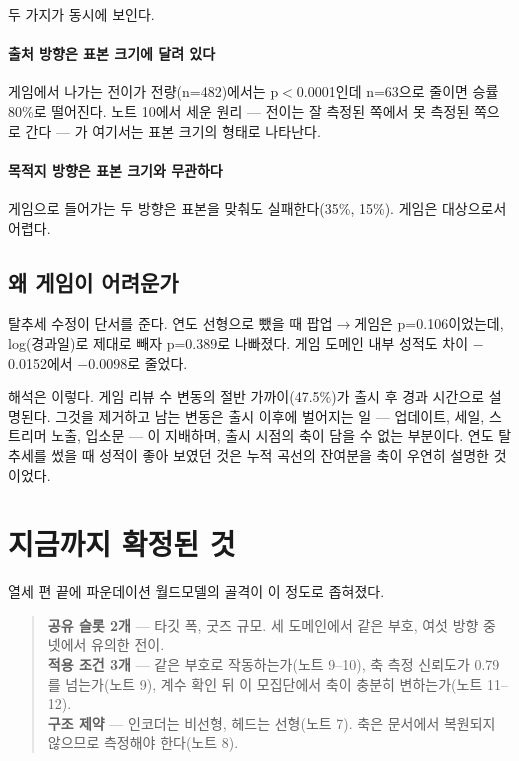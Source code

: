\documentclass[10pt]{article}
\begin{document}
두 가지가 동시에 보인다.

\paragraph{출처 방향은 표본 크기에 달려 있다}
게임에서 나가는 전이가 전량(n=482)에서는 p$<$0.0001인데 n=63으로 줄이면 승률
80\%로 떨어진다. 노트 10에서 세운 원리 --- 전이는 잘 측정된 쪽에서 못 측정된
쪽으로 간다 --- 가 여기서는 표본 크기의 형태로 나타난다.

\paragraph{목적지 방향은 표본 크기와 무관하다}
게임으로 들어가는 두 방향은 표본을 맞춰도 실패한다(35\%, 15\%). 게임은 대상으로서
어렵다.

\subsection{왜 게임이 어려운가}

탈추세 수정이 단서를 준다. 연도 선형으로 뺐을 때 팝업$\to$게임은 p=0.106이었는데,
log(경과일)로 제대로 빼자 p=0.389로 나빠졌다. 게임 도메인 내부 성적도
차이 $-$0.0152에서 $-$0.0098로 줄었다.

해석은 이렇다. 게임 리뷰 수 변동의 절반 가까이(47.5\%)가 출시 후 경과 시간으로
설명된다. 그것을 제거하고 남는 변동은 출시 이후에 벌어지는 일 --- 업데이트, 세일,
스트리머 노출, 입소문 --- 이 지배하며, 출시 시점의 축이 담을 수 없는 부분이다.
연도 탈추세를 썼을 때 성적이 좋아 보였던 것은 누적 곡선의 잔여분을 축이 우연히
설명한 것이었다.


\section{지금까지 확정된 것}

열세 편 끝에 파운데이션 월드모델의 골격이 이 정도로 좁혀졌다.

\begin{quote}\fontsize{9.5}{11.5}\selectfont
\textbf{공유 슬롯 2개} --- 타깃 폭, 굿즈 규모. 세 도메인에서 같은 부호,
여섯 방향 중 넷에서 유의한 전이.\\[0.4em]
\textbf{적용 조건 3개} --- 같은 부호로 작동하는가(노트 9--10), 축 측정 신뢰도가
0.79를 넘는가(노트 9), 계수 확인 뒤 이 모집단에서 축이 충분히 변하는가(노트 11--12).\\[0.4em]
\textbf{구조 제약} --- 인코더는 비선형, 헤드는 선형(노트 7). 축은 문서에서 복원되지
않으므로 측정해야 한다(노트 8).
\end{quote}
\end{document}
